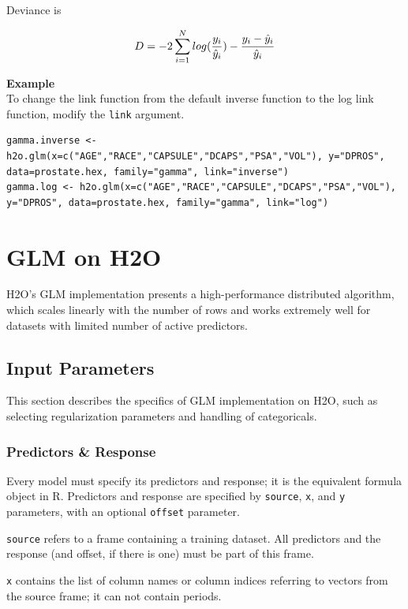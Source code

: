 Deviance is 

\[D = -2\sum\limits_{i=1}\limits^{N}{log({y_i \over \hat{y}_i}) - {y_i - \hat{y}_i \over\hat{y}_i }}\]


\textbf{Example}\\

To change the link function from the default inverse function to the log link function, modify the \texttt{link} argument.

\begin{lstlisting}[style=R]
gamma.inverse <- h2o.glm(x=c("AGE","RACE","CAPSULE","DCAPS","PSA","VOL"), y="DPROS", data=prostate.hex, family="gamma", link="inverse")
gamma.log <- h2o.glm(x=c("AGE","RACE","CAPSULE","DCAPS","PSA","VOL"), y="DPROS", data=prostate.hex, family="gamma", link="log")
\end{lstlisting}


\section{GLM on H2O}
H2O's GLM implementation presents a high-performance distributed algorithm, which scales linearly with the number of rows and works extremely well for datasets with limited number of active predictors. 

\subsection{Input Parameters}
This section describes the specifics of GLM implementation on H2O, such as selecting regularization parameters and handling of categoricals. 

\subsubsection{Predictors \& Response}
Every model must specify its predictors and response; it is the equivalent formula object in R. Predictors and response are specified by \texttt{source}, \texttt{x}, and \texttt{y} parameters, with an optional \texttt{offset} parameter. 

\texttt{source} refers to a frame containing a training dataset. All predictors and the response (and offset, if there is one) must be part of this frame.

\texttt{x} contains the list of column names or column indices referring to vectors from the source frame; it can not contain periods.

